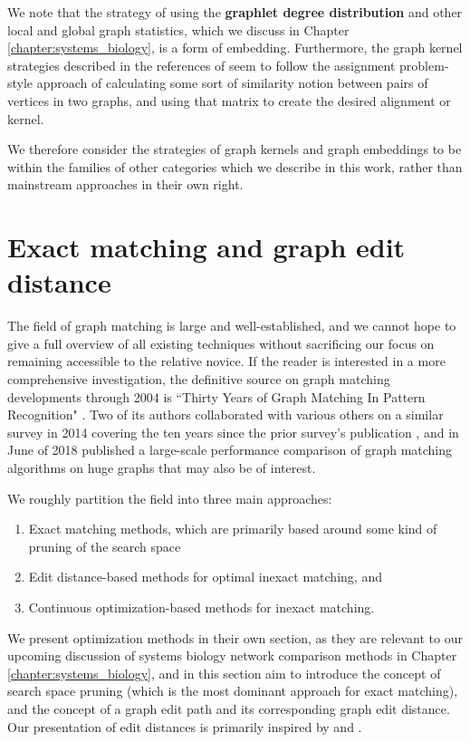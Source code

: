 \documentclass[12pt]{thesis}
\theoremstyle{plain}
\theoremstyle{definition}
\theoremstyle{remark}
\begin{document}
We note that the strategy of using the \textbf{graphlet degree distribution} and other local and global graph statistics, which we discuss in Chapter \ref{chapter:systems_biology}, is a form of embedding. Furthermore, the graph kernel strategies described in the references of  \cite{Livi_2012} seem to follow the assignment problem-style approach of calculating some sort of similarity notion between pairs of vertices in two graphs, and using that matrix to create the desired alignment or kernel. 

We therefore consider the strategies of graph kernels and graph embeddings to be within the families of other categories which we describe in this work, rather than mainstream approaches in their own right.

\section{Exact matching and graph edit distance}

The field of graph matching is large and well-established, and we cannot hope to give a full overview of all existing techniques without sacrificing our focus on remaining accessible to the relative novice. If the reader is interested in a more comprehensive investigation, the definitive source on graph matching developments through 2004 is ``Thirty Years of Graph Matching In Pattern Recognition" \cite{Conte_2004}. Two of its authors collaborated with various others on a similar survey in 2014 covering the ten years since the prior survey's publication \cite{foggia2014graph}, and in June of 2018 published a large-scale performance comparison of graph matching algorithms on huge graphs \cite{carletti2018comparing} that may also be of interest.

We roughly partition the field into three main approaches: 

\begin{enumerate}
\item Exact matching methods, which are primarily based around some kind of pruning of the search space
\item Edit distance-based methods for optimal inexact matching, and 
\item Continuous optimization-based methods for inexact matching. 
\end{enumerate}

We present optimization methods in their own section, as they are relevant to our upcoming discussion of systems biology network comparison methods in Chapter \ref{chapter:systems_biology}, and in this section aim to introduce the concept of search space pruning (which is the most dominant approach for exact matching), and the concept of a graph edit path and its corresponding graph edit distance. Our presentation of edit distances is primarily inspired by \cite{Livi_2012} and \cite{Riesen_2009}.
\end{document}
